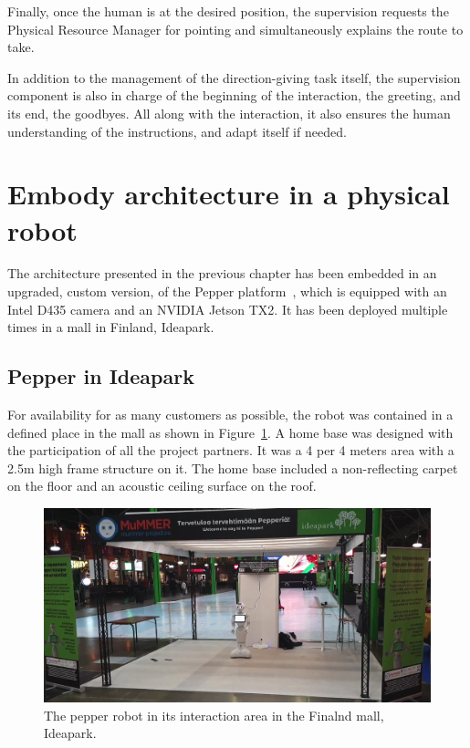 Finally, once the human is at the desired position, the supervision requests the Physical Resource Manager for pointing and simultaneously explains the route to take.

In addition to the management of the direction-giving task itself, the supervision component is also in charge of the beginning of the interaction, the greeting, and its end, the goodbyes. All along with the interaction, it also ensures the human understanding of the instructions, and adapt itself if needed.

\section{Embody architecture in a physical robot}

The architecture presented in the previous chapter has been embedded in an upgraded, custom version, of the Pepper platform~\cite{caniot_2020_adapted}, which is equipped with an Intel D435 camera and an NVIDIA Jetson TX2. It has been deployed multiple times in a mall in Finland, Ideapark.

\subsection{Pepper in Ideapark}

For availability for as many customers as possible, the robot was contained in a defined place in the mall as shown in Figure~\ref{fig:chap8_pepper_mall}. A home base was designed with the participation of all the project partners. It was a 4 per 4 meters area with a 2.5m high frame structure on it. The home base included a non-reflecting carpet on the floor and an acoustic ceiling surface on the roof.

\begin{figure}[ht!]
\centering
\includegraphics[scale=0.2]{figures/chapter8/pepper_mall.png}
\caption{\label{fig:chap8_pepper_mall} The pepper robot in its interaction area in the Finalnd mall, Ideapark. }
\end{figure}

